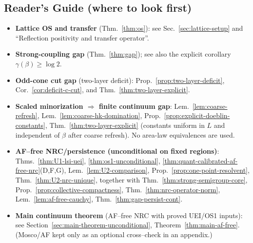 \documentclass[11pt]{amsart}
\theoremstyle{plain}
\theoremstyle{definition}
\theoremstyle{remark}
\begin{document}
\subsection*{Reader's Guide (where to look first)}
\begin{itemize}[leftmargin=2em, itemsep=8pt, parsep=4pt]
  \item \textbf{Lattice OS and transfer} (Thm.~\ref{thm:os}): see Sec.~\ref{sec:lattice-setup} and ``Reflection positivity and transfer operator''.
  
  \item \textbf{Strong-coupling gap} (Thm.~\ref{thm:gap}); see also the explicit corollary $\gamma(\beta)\ge \log 2$.
  
  \item \textbf{Odd-cone cut gap} (two-layer deficit): Prop.~\ref{prop:two-layer-deficit}, Cor.~\ref{cor:deficit-c-cut}, and Thm.~\ref{thm:two-layer-explicit}.
  
  \item \textbf{Scaled minorization $\Rightarrow$ finite continuum gap}: Lem.~\ref{lem:coarse-refresh}, Lem.~\ref{lem:coarse-hk-domination}, Prop.~\ref{prop:explicit-doeblin-constants}, Thm.~\ref{thm:two-layer-explicit} (constants uniform in $L$ and independent of $\beta$ after coarse refresh). No area-law equivalences are used.
  
  \item \textbf{AF--free NRC/persistence (unconditional on fixed regions)}: Thms.~\ref{thm:U1-lsi-uei}, \ref{thm:os1-unconditional}, \ref{thm:quant-calibrated-af-free-nrc}(D,F,G), Lem.~\ref{lem:U2-comparison}, Prop.~\ref{prop:one-point-resolvent}, Thm.~\ref{thm:U2-nrc-unique}, together with Thm.~\ref{thm:strong-semigroup-core}, Prop.~\ref{prop:collective-compactness}, Thm.~\ref{thm:nrc-operator-norm}, Lem.~\ref{lem:af-free-cauchy}, Thm.~\ref{thm:gap-persist-cont}.
  
  \item \textbf{Main continuum theorem} (AF--free NRC with proved UEI/OS1 inputs): see Section~\ref{sec:main-theorem-unconditional}, Theorem~\ref{thm:main-af-free}. (Mosco/AF kept only as an optional cross--check in an appendix.)
\end{itemize}
\end{document}
